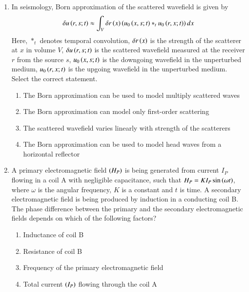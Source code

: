 \documentclass[journal,12pt,onecolumn]{IEEEtran}
\theoremstyle{remark}
\begin{document}
\begin{enumerate}
\item In seismology, Born approximation of the scattered  wavefield is given by
\begin{align*}
    \delta u\left(r,s;t\right) \approx \int_V \delta r\left(x\right)\left(u_0\left(x,s;t\right) *_t u_0\left(r,x;t\right)\right)dx
\end{align*}
Here, $*_t$ denotes temporal convolution, $\delta r\left(x\right)$ is the strength of the scatterer at $x$ in volume $V$, $\delta u\left(r,s;t\right)$ is the scattered wavefield measured at the receiver $r$ from the source $s$, $u_0\left(x,s;t\right)$ is the downgoing wavefield  in the unperturbed medium, $u_0\left(r,x;t\right)$ is the upgoing wavefield  in the unperturbed medium. Select the correct statement. \hfill{}
\begin{enumerate}
    \item The Born approximation can be used to model multiply scattered waves
    \item The Born approximation can model only first-order scattering
    \item The scattered wavefield varies linearly with strength of the scatterers
    \item The Born approximation can be used to model head waves from a horizontal reflector
\end{enumerate}

\item A primary electromagnetic field $\left(H_P\right)$ is being generated from current $I_P$ flowing in a coil A with negligible capacitance, such that $H_P = KI_P \sin\left(\omega t\right)$, where $\omega$ is the angular frequency, $K$ is a constant and $t$ is time. A secondary electromagnetic field is being produced by induction in a conducting coil B. The phase difference between the primary and the secondary electromagnetic fields depends on which of the following factors? \hfill{}
\begin{enumerate}
    \item Inductance of coil B
    \item Resistance of coil B
    \item Frequency of the primary electromagnetic field
    \item Total current $\left(I_P\right)$ flowing through the coil A
\end{enumerate}


\end{enumerate}
\end{document}
